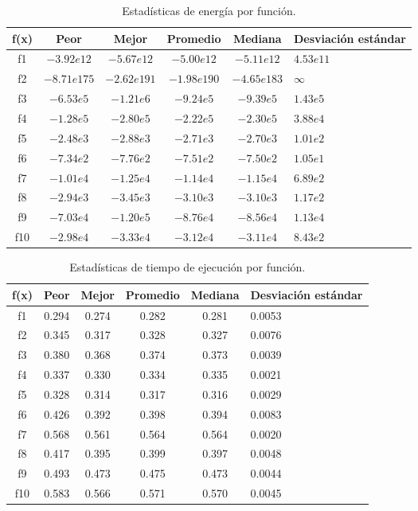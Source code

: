 \begin{table}[H]
	\centering
	\begin{tabular}{|c|c|c|c|c|p{2.1cm}|}  
		\hline
		\textbf{f(x)} & \textbf{Peor} & \textbf{Mejor} & \textbf{Promedio} & \textbf{Mediana} & \textbf{Desviación estándar} \\  
		\hline
		f1  & \(-3.92e{12}\) & \(-5.67e{12}\) & \(-5.00e{12}\) & \(-5.11e{12}\) & \(4.53e{11}\) \\ 
		f2  & \(-8.71e{175}\) & \(-2.62e{191}\) & \(-1.98e{190}\) & \(-4.65e{183}\) & \(\infty\) \\ 
		f3  & \(-6.53e{5}\) & \(-1.21e{6}\) & \(-9.24e{5}\) & \(-9.39e{5}\) & \(1.43e{5}\) \\ 
		f4  & \(-1.28e{5}\) & \(-2.80e{5}\) & \(-2.22e{5}\) & \(-2.30e{5}\) & \(3.88e{4}\) \\ 
		f5  & \(-2.48e{3}\) & \(-2.88e{3}\) & \(-2.71e{3}\) & \(-2.70e{3}\) & \(1.01e{2}\) \\ 
		f6  & \(-7.34e{2}\) & \(-7.76e{2}\) & \(-7.51e{2}\) & \(-7.50e{2}\) & \(1.05e{1}\) \\ 
		f7  & \(-1.01e{4}\) & \(-1.25e{4}\) & \(-1.14e{4}\) & \(-1.15e{4}\) & \(6.89e{2}\) \\ 
		f8  & \(-2.94e{3}\) & \(-3.45e{3}\) & \(-3.10e{3}\) & \(-3.10e{3}\) & \(1.17e{2}\) \\ 
		f9  & \(-7.03e{4}\) & \(-1.20e{5}\) & \(-8.76e{4}\) & \(-8.56e{4}\) & \(1.13e{4}\) \\ 
		f10 & \(-2.98e{4}\) & \(-3.33e{4}\) & \(-3.12e{4}\) & \(-3.11e{4}\) & \(8.43e{2}\) \\
		\hline
	\end{tabular}
	\caption{Estadísticas de energía por función.}
	\label{tab:res_cec_res}
\end{table}


\begin{table}[H]
	\centering
	\begin{tabular}{|c|c|c|c|c|p{2.1cm}|}  
		\hline
		\textbf{f(x)} & \textbf{Peor} & \textbf{Mejor} & \textbf{Promedio} & \textbf{Mediana} & \textbf{Desviación estándar} \\  
		\hline
		f1  & 0.294 & 0.274 & 0.282 & 0.281 & 0.0053 \\ 
		f2  & 0.345 & 0.317 & 0.328 & 0.327 & 0.0076 \\ 
		f3  & 0.380 & 0.368 & 0.374 & 0.373 & 0.0039 \\ 
		f4  & 0.337 & 0.330 & 0.334 & 0.335 & 0.0021 \\ 
		f5  & 0.328 & 0.314 & 0.317 & 0.316 & 0.0029 \\ 
		f6  & 0.426 & 0.392 & 0.398 & 0.394 & 0.0083 \\ 
		f7  & 0.568 & 0.561 & 0.564 & 0.564 & 0.0020 \\ 
		f8  & 0.417 & 0.395 & 0.399 & 0.397 & 0.0048 \\ 
		f9  & 0.493 & 0.473 & 0.475 & 0.473 & 0.0044 \\ 
		f10 & 0.583 & 0.566 & 0.571 & 0.570 & 0.0045 \\
		\hline
	\end{tabular}
	\caption{Estadísticas de tiempo de ejecución por función.}
	\label{tab:res_cec_time}
\end{table}


